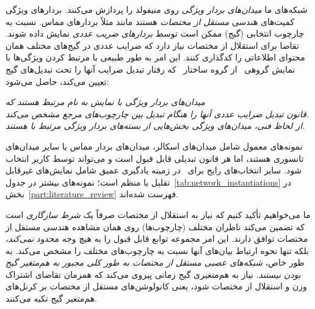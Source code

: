 شبکه‌های ما \emph{میدان‌های بردار ویژگی} روی منیفولد را پردازش می‌کنند.
بردارهای ویژگی کمیت‌های هندسی \emph{مستقل از مختصات} هستند مانند مثلاً بردارهای مماس.
نسبت به چارچوب انتخابی (گیج) ممکن است توسط \emph{بردارهای ضریب عددی} نمایش داده شوند.
تقاضا برای استقلال از مختصات \lr{$\GM$} نیاز دارد که ضرایب عددی در گیج‌های مختلف همان محتوای اطلاعاتی را کدگذاری کنند.
این امر به طور طبیعی با مرتبط کردن ویژگی‌ها با نمایش گروهی~\lr{$\rho$} از گروه ساختار~ که رفتار تبدیل ضرایب آنها را تحت تبدیل‌های گیج تعیین می‌کند، حاصل می‌شود:
\begin{center}\it
	میدان‌های بردار ویژگی با نمایش  به نام \lr{$\rho$} مرتبط هستند که \\
	قانون تبدیل ضرایب عددی آنها را هنگام تبدیل بین چارچوب‌های مرجع مشخص می‌کند.
	\\[1ex]
	از لحاظ فنی، میدان‌های ویژگی بخش‌هایی از بسته‌های بردار ویژگی مرتبط با  هستند.
\end{center}
نمونه‌های معمول شامل میدان‌های اسکالر، میدان‌های بردار مماس یا سایر میدان‌های تانسوری هستند، اما هر قانون تبدیلی قابل قبول است و می‌تواند توسط کاربر انتخاب شود.
سایر انتخاب‌های رایج برای~\lr{$\rho$} در زمینه یادگیری عمیق شامل نمایش‌های غیرقابل تقلیل یا منظم است؛
نمونه‌های بیشتر در جدول~\ref{tab:network_instantiations} در بخش~\ref{part:literature_review} فهرست شده‌اند.


ما می‌خواهیم تأکید کنیم که نیاز به استقلال از مختصات \lr{$\GM$} صرفاً یک \emph{شرط سازگاری} است که تضمین می‌کند ناظران مختلف (چارچوب‌ها) روی همان مشاهده هندسی مستقل از مختصات توافق دارند.
این امر مجموعه توابع قابل قبول را به هیچ وجه محدود \emph{نمی‌کند}، بلکه تنها نحوه ارتباط بیان‌های آنها نسبت به چارچوب‌های مختلف را مشخص می‌کند.
به طور خاص، \emph{شبکه‌های عصبی مستقل از مختصات \lr{$\GM$} به طور کلی مجبور به هم‌متغیر گیج بودن نیستند}.
نیاز به هم‌متغیری گیج زمانی پیروی می‌کند که همزمان تقاضای اشتراک وزن و استقلال از مختصات شود، یعنی کانولوشن‌های مستقل از مختصات \lr{$\GM$} بر کرنل‌های هم‌متغیر گیج تکیه می‌کنند.



